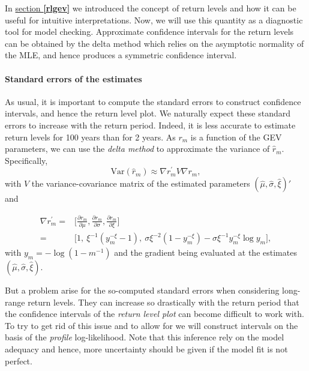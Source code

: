 In \hyperref[rlgev]{section \textbf{\ref{rlgev}}} we introduced the concept of return levels and how it can be useful for intuitive interpretations. Now, we will use this quantity as a diagnostic tool for model checking.  
Approximate confidence intervals for the return levels can be obtained by the
delta method which relies on the asymptotic normality of the MLE, and hence produces a symmetric confidence interval.

\paragraph*{Standard errors of the estimates}As usual, it is important to compute the standard errors to construct confidence intervals, and hence the return level plot. We naturally expect these standard errors to increase with the return period. Indeed, it is less accurate to estimate return levels for 100 years than for 2 years.
As $r_m$ is a function of the GEV parameters, we can use the \emph{delta method} to approximate the variance of $\hat{r}_m$. Specifically,
\begin{equation*}
\text{Var}(\hat{r}_m)\approx\nabla{r^{'}_m}V\nabla{r_m},
\end{equation*}
with $V$ the variance-covariance matrix of the estimated parameters $(\hat{\mu},\hat{\sigma},\hat{\xi})'$ and 

\begin{equation} \label{delta}
\begin{aligned}
\nabla r^{'}_m=
& \Bigg[\frac{\partial r_m}{\partial\mu},\frac{\partial r_m}{\partial\sigma},\frac{\partial r_m}{\partial\xi}\Bigg] \\ 
= & \Big[1,\ \xi^{-1}(y_m^{-\xi}-1),\ \sigma\xi^{-2}(1-y_m^{-\xi})-\sigma\xi^{-1}y_m^{-\xi}\log y_m\Big],
\end{aligned}
\end{equation}
with $y_m=-\log (1-m^{-1})$ and the gradient being evaluated at the estimates $(\hat{\mu},\hat{\sigma},\hat{\xi})$.

But a problem arise for the so-computed standard errors when considering long-range return levels. They can increase so drastically with the return period that the confidence intervals of the \emph{return level plot} can become difficult to work with. To try to get rid of this issue and to allow for we will construct intervals on the basis of the \emph{profile} log-likelihood. Note that this inference rely on the model adequacy and hence, more uncertainty should be given if the model fit is not perfect.

